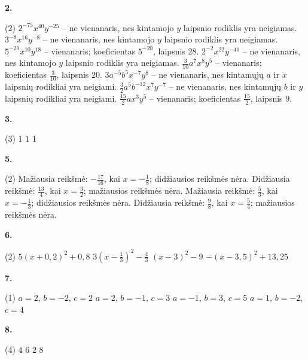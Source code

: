 \documentclass[11pt, a4paper]{article}
\begin{document}
\vspace{0.5cm}
\textbf{2.}
\begin{tasks}(2)
    \task \(2^{-75}x^{40}y^{-25}\) – ne vienanaris, nes kintamojo \(y\) laipsnio rodiklis yra neigiamas.
    \task \(3^{-8}x^{16}y^{-8}\) – ne vienanaris, nes kintamojo \(y\) laipsnio rodiklis yra neigiamas.
    \task \(5^{-20}x^{10}y^{18}\) – vienanaris; koeficientas \(5^{-20}\), laipsnis \(28\).
    \task \(2^{-2}x^{22}y^{-41}\) – ne vienanaris, nes kintamojo \(y\) laipsnio rodiklis yra neigiamas.
    \task \(\frac{3}{10}a^7x^8y^5\) – vienanaris; koeficientas \(\frac{3}{10}\), laipsnis \(20\).
    \task \(3a^{-5}b^5x^{-7}y^8\) – ne vienanaris, nes kintamųjų \(a\) ir \(x\) laipsnių rodikliai yra neigiami.
    \task \(\frac{3}{2}a^5b^{-12}x^7y^{-7}\) – ne vienanaris, nes kintamųjų \(b\) ir \(y\) laipsnių rodikliai yra neigiami.
    \task \(\frac{15}{2}ax^3y^5\) – vienanaris; koeficientas \(\frac{15}{2}\), laipsnis \(9\).
\end{tasks}

\vspace{0.5cm}
\textbf{3.}
\begin{tasks}(3)
    \task $1$
    \task $1$
    \task $1$
\end{tasks}

\vspace{0.5cm}
\textbf{5.}
\begin{tasks}(2)
    \task Mažiausia reikšmė: \(-\frac{17}{16}\), kai \(x=-\frac{1}{8}\); didžiausios reikšmės nėra.
    \task Didžiausia reikšmė: \(\frac{13}{4}\), kai \(x=\frac{3}{2}\); mažiausios reikšmės nėra.
    \task Mažiausia reikšmė: \(\frac{5}{3}\), kai \(x=-\frac{1}{3}\); didžiausios reikšmės nėra.
    \task Didžiausia reikšmė: \(\frac{9}{8}\), kai \(x=\frac{5}{4}\); mažiausios reikšmės nėra.
\end{tasks}

\vspace{0.5cm}
\textbf{6.}
\begin{tasks}(2)
    \task \(5(x+0,2)^2+0,8\)
    \task \(3\left(x-\frac{1}{3}\right)^2-\frac{4}{3}\)
    \task \((x-3)^2-9\)
    \task \(-(x-3,5)^2+13,25\)
\end{tasks}

\vspace{0.5cm}
\textbf{7.}
\begin{tasks}(1)
    \task \(a = 2\), \(b = -2\), \(c = 2\)
    \task \(a = 2\), \(b = -1\), \(c = 3\)
    \task \(a = -1\), \(b = 3\), \(c = 5\)
    \task \(a = 1\), \(b = -2\), \(c = 4\)
\end{tasks}

\vspace{0.5cm}
\textbf{8.}
\begin{tasks}(4)
    \task $4$
    \task $6$
    \task $2$
    \task $8$
\end{tasks}
\end{document}
